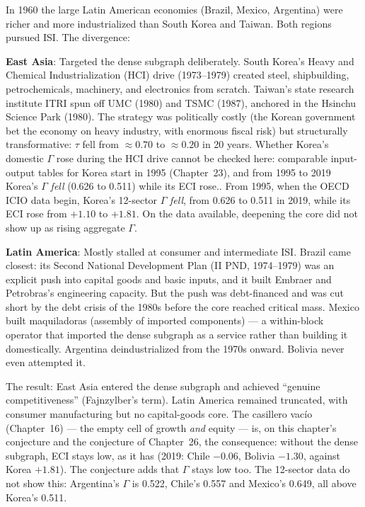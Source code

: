\documentclass[../structural_economics_book.tex]{subfiles}
\begin{document}
\begin{example}\label{ch25:ex:divergence}
In 1960 the large Latin American economies (Brazil, Mexico, Argentina) were richer and more industrialized than South Korea and Taiwan. Both regions pursued ISI. The divergence:

\textbf{East Asia}: Targeted the dense subgraph deliberately. South Korea's Heavy and Chemical Industrialization (HCI) drive (1973--1979) created steel, shipbuilding, petrochemicals, machinery, and electronics from scratch. Taiwan's state research institute ITRI spun off UMC (1980) and TSMC (1987), anchored in the Hsinchu Science Park (1980). The strategy was politically costly (the Korean government bet the economy on heavy industry, with enormous fiscal risk) but structurally transformative: $\tau$ fell from $\approx 0.70$ to $\approx 0.20$ in 20 years. Whether Korea's domestic $\Gamma$ rose during the HCI drive cannot be checked here: comparable input-output tables for Korea start in 1995 (Chapter~23), and from 1995 to 2019 Korea's $\Gamma$ \emph{fell} (0.626 to 0.511) while its ECI rose.. From 1995, when the OECD ICIO data begin, Korea's 12-sector $\Gamma$ \emph{fell}, from 0.626 to 0.511 in 2019, while its ECI rose from $+1.10$ to $+1.81$. On the data available, deepening the core did not show up as rising aggregate $\Gamma$.

\textbf{Latin America}: Mostly stalled at consumer and intermediate ISI. Brazil came closest: its Second National Development Plan (II PND, 1974--1979) was an explicit push into capital goods and basic inputs, and it built Embraer and Petrobras's engineering capacity. But the push was debt-financed and was cut short by the debt crisis of the 1980s before the core reached critical mass. Mexico built maquiladoras (assembly of imported components) --- a within-block operator that imported the dense subgraph as a service rather than building it domestically. Argentina deindustrialized from the 1970s onward. Bolivia never even attempted it.

The result: East Asia entered the dense subgraph and achieved ``genuine competitiveness'' (Fajnzylber's term). Latin America remained truncated, with consumer manufacturing but no capital-goods core. The casillero vac\'{i}o (Chapter~16) --- the empty cell of growth \emph{and} equity --- is, on this chapter's conjecture and the conjecture of Chapter~26, the consequence: without the dense subgraph, ECI stays low, as it has (2019: Chile $-0.06$, Bolivia $-1.30$, against Korea $+1.81$). The conjecture adds that $\Gamma$ stays low too. The 12-sector data do not show this: Argentina's $\Gamma$ is 0.522, Chile's 0.557 and Mexico's 0.649, all above Korea's 0.511.
\end{example}
\end{document}
